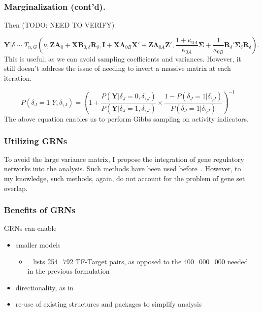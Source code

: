 \documentclass{beamer}
\begin{document}
\begin{frame}
  \frametitle{Marginalization (cont'd).}
  Then (TODO: NEED TO VERIFY)

  \[
    \mathbf Y | \delta \sim T_{n, G}(
      \nu, 
      \mathbf Z\mathbf A_0 + \mathbf X\mathbf B_{0,\delta}\mathbf R_\delta, 
      \mathbf I + \mathbf X \mathbf\Lambda_{0B}\mathbf X' + \mathbf Z\mathbf\Lambda_{0A}\mathbf Z', 
      \frac{1 + \kappa_{0A}}{\kappa_{0A}}\mathbf\Sigma + \frac{1}{\kappa_{0B}}\mathbf R_\delta'\mathbf\Sigma_\delta\mathbf R_\delta
    ).
  \]
  This is useful, as we can avoid sampling coefficients and variances. 
  However, it still doesn't address the issue of needing to invert a massive matrix at each iteration. 
  \vfill 

  \[
    P(\delta_J = 1 | Y, \delta_{\setminus J}) = \left(
      1 + \frac{P(\mathbf Y|\delta_J = 0, \delta_{\setminus J})}{P(\mathbf Y|\delta_J = 1, \delta_{\setminus J})} \times 
      \frac{1 - P(\delta_J = 1 | \delta_{\setminus J})}{P(\delta_J = 1 | \delta_{\setminus J})}
    \right)^{-1}
  \]
  The above equation enables us to perform Gibbs sampling on activity indicators.
\end{frame}

\begin{frame}
  \frametitle{Utilizing GRNs}
  To avoid the large variance matrix, I propose the integration of gene regulatory networks into the analysis. 
  Such methods have been used before~\cite{Wang-2024-GINtool, Alexeyenko-2012-networkGSEA}. 
  However, to my knowledge, such methods, again, do not account for the problem of gene set overlap.  
\end{frame}

\begin{frame}
  \frametitle{Benefits of GRNs}
  GRNs can enable  
  \begin{itemize}
      \item smaller models \begin{itemize}
	\item ~\cite{Fang-2021-GRNdb} lists 254\_792 TF-Target pairs, as opposed to the 400\_000\_000 needed in the previous formulation 
      \end{itemize}
    \item directionality, as in~\cite{Wang-2024-GINtool}
    \item re-use of existing structures and packages to simplify analysis 
  \end{itemize} 
\end{frame}
\end{document}
